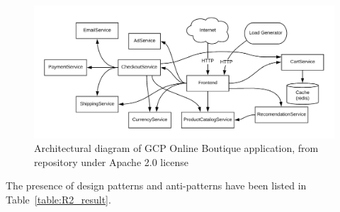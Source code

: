 \documentclass{Configuration_Files/PoliMi3i_thesis}
\begin{document}
\begin{figure}[H]
\centering
\includegraphics[width=1\textwidth]{myImages/R2.png}
\caption{Architectural diagram of GCP Online Boutique application, from repository under Apache 2.0 license}
\label{fig:R2_arch}
\end{figure}

The presence of design patterns and anti-patterns have been listed in Table~\ref{table:R2_result}.
\end{document}
